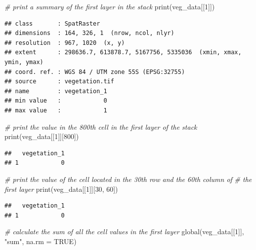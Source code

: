 \documentclass[
  12pt,
]{book}
\newenvironment{Shaded}{\begin{snugshade}}{\end{snugshade}}
\newcommand{\AttributeTok}[1]{\textcolor[rgb]{0.77,0.63,0.00}{#1}}
\newcommand{\CommentTok}[1]{\textcolor[rgb]{0.56,0.35,0.01}{\textit{#1}}}
\newcommand{\ConstantTok}[1]{\textcolor[rgb]{0.00,0.00,0.00}{#1}}
\newcommand{\DecValTok}[1]{\textcolor[rgb]{0.00,0.00,0.81}{#1}}
\newcommand{\FunctionTok}[1]{\textcolor[rgb]{0.00,0.00,0.00}{#1}}
\newcommand{\NormalTok}[1]{#1}
\newcommand{\StringTok}[1]{\textcolor[rgb]{0.31,0.60,0.02}{#1}}
\begin{document}
\begin{Shaded}
\begin{Highlighting}[]
\CommentTok{\# print a summary of the first layer in the stack}
\FunctionTok{print}\NormalTok{(veg\_data[[}\DecValTok{1}\NormalTok{]])}
\end{Highlighting}
\end{Shaded}

\begin{verbatim}
## class       : SpatRaster 
## dimensions  : 164, 326, 1  (nrow, ncol, nlyr)
## resolution  : 967, 1020  (x, y)
## extent      : 298636.7, 613878.7, 5167756, 5335036  (xmin, xmax, ymin, ymax)
## coord. ref. : WGS 84 / UTM zone 55S (EPSG:32755) 
## source      : vegetation.tif 
## name        : vegetation_1 
## min value   :            0 
## max value   :            1
\end{verbatim}

\begin{Shaded}
\begin{Highlighting}[]
\CommentTok{\# print the value in the 800th cell in the first layer of the stack}
\FunctionTok{print}\NormalTok{(veg\_data[[}\DecValTok{1}\NormalTok{]][}\DecValTok{800}\NormalTok{])}
\end{Highlighting}
\end{Shaded}

\begin{verbatim}
##   vegetation_1
## 1            0
\end{verbatim}

\begin{Shaded}
\begin{Highlighting}[]
\CommentTok{\# print the value of the cell located in the 30th row and the 60th column of}
\CommentTok{\# the first layer}
\FunctionTok{print}\NormalTok{(veg\_data[[}\DecValTok{1}\NormalTok{]][}\DecValTok{30}\NormalTok{, }\DecValTok{60}\NormalTok{])}
\end{Highlighting}
\end{Shaded}

\begin{verbatim}
##   vegetation_1
## 1            0
\end{verbatim}

\begin{Shaded}
\begin{Highlighting}[]
\CommentTok{\# calculate the sum of all the cell values in the first layer}
\FunctionTok{global}\NormalTok{(veg\_data[[}\DecValTok{1}\NormalTok{]], }\StringTok{"sum"}\NormalTok{, }\AttributeTok{na.rm =} \ConstantTok{TRUE}\NormalTok{)}
\end{Highlighting}
\end{Shaded}
\end{document}
